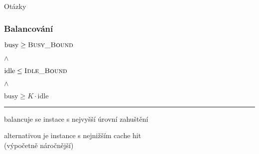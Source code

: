\documentclass[xcolor=svgnames]{beamer}
\begin{document}
\begin{frame}
	\begin{center}
		{\Huge Otázky}
	\end{center}
\end{frame}
\begin{frame}
	\frametitle{Balancování}
	\begin{center}
		{\large
			$\textrm{busy} \geq \textsc{Busy\_Bound}$

			$\wedge$

			$\textrm{idle} \leq \textsc{Idle\_Bound}$

			$\wedge$

			$\textrm{busy} \geq K \cdot \textrm{idle}$
		}

		\bigskip
		\hrule
		\bigskip

		balancuje se instace s nejvyšší úrovní zahuštění

		\bigskip

		alternativou je instance s nejnižším cache hit\\
		(výpočetně náročnější)
	\end{center}
\end{frame}
\end{document}
